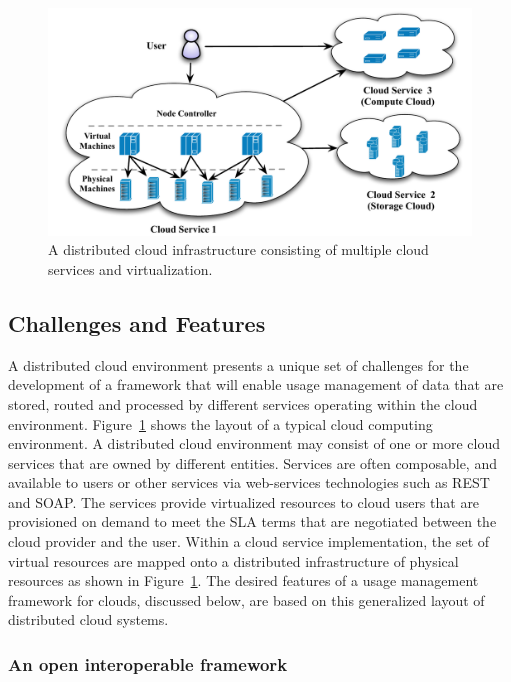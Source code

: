 \documentclass[10pt, conference, compsocconf]{IEEEtran}
\begin{document}
\begin{figure}[t]
\centering
\includegraphics[width=14cm]{cloud-infra}
\caption{A distributed cloud infrastructure consisting of multiple cloud services and virtualization.}
\label{fig:cloud-infra}
\end{figure}



\subsection{Challenges and Features}
A distributed cloud environment presents a unique set of challenges for the development of a framework that will enable usage management of data that are stored, routed and processed by different services operating within the cloud environment. Figure~\ref{fig:cloud-infra} shows the layout of a typical cloud computing environment. A distributed cloud environment may consist of one or more cloud services that are owned by different entities. Services are often composable, and available to users or other services via web-services technologies such as REST and SOAP.  The services provide virtualized resources to cloud users that are provisioned on demand to meet the SLA terms that are negotiated between the cloud provider and the user. Within a cloud service implementation, the set of virtual resources are mapped onto a distributed infrastructure of physical resources as shown in Figure~\ref{fig:cloud-infra}. The desired features of a usage management framework for clouds, discussed below, are based on this generalized layout of distributed cloud systems.

\subsubsection {An open interoperable framework}
\end{document}
